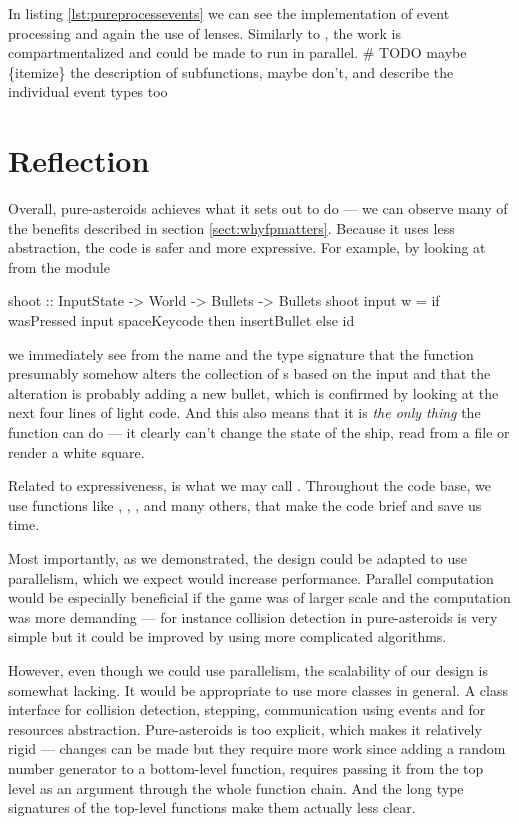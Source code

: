 \documentclass[
  digital, %
  color,   %
  table,   %
  oneside, %
  lof,     %
  lot,     %
]{fithesis3}
\begin{document}
{%
In listing \ref{lst:pureprocessevents} we can see the implementation of
event processing and again the use of lenses.
Similarly to , the work is compartmentalized
and could be made to run in parallel.
\# TODO maybe \{itemize\} the description of subfunctions,
maybe don't, and describe the individual event types too


\section{Reflection}
\label{sect:purereflection}

Overall, pure-asteroids achieves what it sets out to do --- we can observe
many of the benefits described in section \ref{sect:whyfpmatters}.
Because it uses less abstraction, the code is safer and more expressive.
For example, by looking at  from the  module
\begin{haskell}
shoot :: InputState -> World -> Bullets -> Bullets
shoot input w =
    if wasPressed input spaceKeycode
        then insertBullet
        else id
\end{haskell}
we immediately see from the name and the type signature that the function presumably
somehow alters the collection of s based on the input and that
the alteration is probably adding a new bullet, which is confirmed by looking
at the next four lines of light code. And this also means that it is \emph{the only thing}
the function can do --- it clearly can't change the state of the ship, read from a file
or render a white square.

Related to expressiveness, is what we may call .
Throughout the code base, we use functions like , ,
,  and many others, that make the code brief
and save us time.

Most importantly, as we demonstrated, the design could be adapted to
use parallelism, which we expect would increase performance.
Parallel computation would be especially beneficial if the game was of larger scale
and the computation was more demanding --- for instance collision detection
in pure-asteroids is very simple but it could be improved by using more
complicated algorithms.

However, even though we could use parallelism, the scalability of our design is somewhat lacking.
It would be appropriate to use more classes in general. A class interface for
collision detection, stepping, communication using events and for resources abstraction.
Pure-asteroids is too explicit, which makes it relatively rigid
--- changes can be made but they require more work since adding a random number
generator to a bottom-level function, requires passing it from the top level
as an argument through the whole function chain. And the long type signatures of the
top-level functions make them actually less clear.

}
\end{document}
